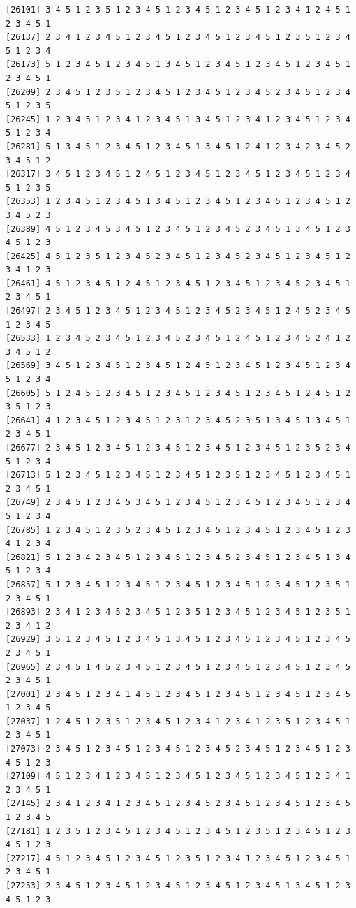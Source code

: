 \documentclass[
  11pt,
]{book}
\begin{document}
\begin{verbatim}
[26101] 3 4 5 1 2 3 5 1 2 3 4 5 1 2 3 4 5 1 2 3 4 5 1 2 3 4 1 2 4 5 1 2 3 4 5 1
[26137] 2 3 4 1 2 3 4 5 1 2 3 4 5 1 2 3 4 5 1 2 3 4 5 1 2 3 5 1 2 3 4 5 1 2 3 4
[26173] 5 1 2 3 4 5 1 2 3 4 5 1 3 4 5 1 2 3 4 5 1 2 3 4 5 1 2 3 4 5 1 2 3 4 5 1
[26209] 2 3 4 5 1 2 3 5 1 2 3 4 5 1 2 3 4 5 1 2 3 4 5 2 3 4 5 1 2 3 4 5 1 2 3 5
[26245] 1 2 3 4 5 1 2 3 4 1 2 3 4 5 1 3 4 5 1 2 3 4 1 2 3 4 5 1 2 3 4 5 1 2 3 4
[26281] 5 1 3 4 5 1 2 3 4 5 1 2 3 4 5 1 3 4 5 1 2 4 1 2 3 4 2 3 4 5 2 3 4 5 1 2
[26317] 3 4 5 1 2 3 4 5 1 2 4 5 1 2 3 4 5 1 2 3 4 5 1 2 3 4 5 1 2 3 4 5 1 2 3 5
[26353] 1 2 3 4 5 1 2 3 4 5 1 3 4 5 1 2 3 4 5 1 2 3 4 5 1 2 3 4 5 1 2 3 4 5 2 3
[26389] 4 5 1 2 3 4 5 3 4 5 1 2 3 4 5 1 2 3 4 5 2 3 4 5 1 3 4 5 1 2 3 4 5 1 2 3
[26425] 4 5 1 2 3 5 1 2 3 4 5 2 3 4 5 1 2 3 4 5 2 3 4 5 1 2 3 4 5 1 2 3 4 1 2 3
[26461] 4 5 1 2 3 4 5 1 2 4 5 1 2 3 4 5 1 2 3 4 5 1 2 3 4 5 2 3 4 5 1 2 3 4 5 1
[26497] 2 3 4 5 1 2 3 4 5 1 2 3 4 5 1 2 3 4 5 2 3 4 5 1 2 4 5 2 3 4 5 1 2 3 4 5
[26533] 1 2 3 4 5 2 3 4 5 1 2 3 4 5 2 3 4 5 1 2 4 5 1 2 3 4 5 2 4 1 2 3 4 5 1 2
[26569] 3 4 5 1 2 3 4 5 1 2 3 4 5 1 2 4 5 1 2 3 4 5 1 2 3 4 5 1 2 3 4 5 1 2 3 4
[26605] 5 1 2 4 5 1 2 3 4 5 1 2 3 4 5 1 2 3 4 5 1 2 3 4 5 1 2 4 5 1 2 3 5 1 2 3
[26641] 4 1 2 3 4 5 1 2 3 4 5 1 2 3 1 2 3 4 5 2 3 5 1 3 4 5 1 3 4 5 1 2 3 4 5 1
[26677] 2 3 4 5 1 2 3 4 5 1 2 3 4 5 1 2 3 4 5 1 2 3 4 5 1 2 3 5 2 3 4 5 1 2 3 4
[26713] 5 1 2 3 4 5 1 2 3 4 5 1 2 3 4 5 1 2 3 5 1 2 3 4 5 1 2 3 4 5 1 2 3 4 5 1
[26749] 2 3 4 5 1 2 3 4 5 3 4 5 1 2 3 4 5 1 2 3 4 5 1 2 3 4 5 1 2 3 4 5 1 2 3 4
[26785] 1 2 3 4 5 1 2 3 5 2 3 4 5 1 2 3 4 5 1 2 3 4 5 1 2 3 4 5 1 2 3 4 1 2 3 4
[26821] 5 1 2 3 4 2 3 4 5 1 2 3 4 5 1 2 3 4 5 2 3 4 5 1 2 3 4 5 1 3 4 5 1 2 3 4
[26857] 5 1 2 3 4 5 1 2 3 4 5 1 2 3 4 5 1 2 3 4 5 1 2 3 4 5 1 2 3 5 1 2 3 4 5 1
[26893] 2 3 4 1 2 3 4 5 2 3 4 5 1 2 3 5 1 2 3 4 5 1 2 3 4 5 1 2 3 5 1 2 3 4 1 2
[26929] 3 5 1 2 3 4 5 1 2 3 4 5 1 3 4 5 1 2 3 4 5 1 2 3 4 5 1 2 3 4 5 2 3 4 5 1
[26965] 2 3 4 5 1 4 5 2 3 4 5 1 2 3 4 5 1 2 3 4 5 1 2 3 4 5 1 2 3 4 5 2 3 4 5 1
[27001] 2 3 4 5 1 2 3 4 1 4 5 1 2 3 4 5 1 2 3 4 5 1 2 3 4 5 1 2 3 4 5 1 2 3 4 5
[27037] 1 2 4 5 1 2 3 5 1 2 3 4 5 1 2 3 4 1 2 3 4 1 2 3 5 1 2 3 4 5 1 2 3 4 5 1
[27073] 2 3 4 5 1 2 3 4 5 1 2 3 4 5 1 2 3 4 5 2 3 4 5 1 2 3 4 5 1 2 3 4 5 1 2 3
[27109] 4 5 1 2 3 4 1 2 3 4 5 1 2 3 4 5 1 2 3 4 5 1 2 3 4 5 1 2 3 4 1 2 3 4 5 1
[27145] 2 3 4 1 2 3 4 1 2 3 4 5 1 2 3 4 5 2 3 4 5 1 2 3 4 5 1 2 3 4 5 1 2 3 4 5
[27181] 1 2 3 5 1 2 3 4 5 1 2 3 4 5 1 2 3 4 5 1 2 3 5 1 2 3 4 5 1 2 3 4 5 1 2 3
[27217] 4 5 1 2 3 4 5 1 2 3 4 5 1 2 3 5 1 2 3 4 1 2 3 4 5 1 2 3 4 5 1 2 3 4 5 1
[27253] 2 3 4 5 1 2 3 4 5 1 2 3 4 5 1 2 3 4 5 1 2 3 4 5 1 3 4 5 1 2 3 4 5 1 2 3

\end{verbatim}
\end{document}
